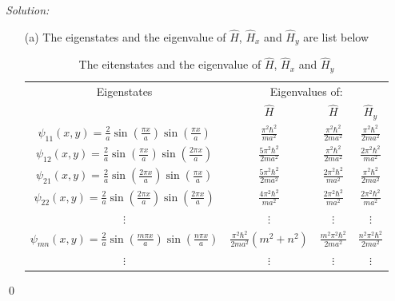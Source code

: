 \documentclass[12pt,a4paper]{article}
\newenvironment{sol}
    {\emph{Solution:}
    }
    {
    \qed
    }
\begin{document}
\begin{sol}
\begin{itemize}
\item[(a)] The eigenstates and the eigenvalue of $\hat{H}$, $\hat{H}_x$ and $\hat{H}_y$ are list below
\begin{table}[h]
\centering
\caption{The eitenstates and the eigenvalue of $\hat{H}$, $\hat{H}_x$ and $\hat{H}_y$}
\begin{tabular}{|c|c|c|c|}
\hline
\multirow{2}{*}{Eigenstates} & \multicolumn{3}{c|}{Eigenvalues of:}                                                                      \\ \cline{2-4} 
                              & $\hat{H}$                             & $\hat{H}$                       & $\hat{H}_y$                     \\ \hline
$\psi_{11}(x,y)=\frac{2}{a}\sin\left(\frac{\pi x}{a}\right)\sin\left(\frac{\pi x}{a}\right)$             & $\frac{\pi^2\hbar^2}{ma^2}$           & $\frac{\pi^2\hbar^2}{2ma^2}$    & $\frac{\pi^2\hbar^2}{2ma^2}$    \\ \hline
$\psi_{12}(x,y)=\frac{2}{a}\sin\left(\frac{\pi x}{a}\right)\sin\left(\frac{2\pi x}{a}\right)$             & $\frac{5\pi^2\hbar^2}{2ma^2}$         & $\frac{\pi^2\hbar^2}{2ma^2}$    & $\frac{2\pi^2\hbar^2}{ma^2}$    \\ \hline
$\psi_{21}(x,y)=\frac{2}{a}\sin\left(\frac{2\pi x}{a}\right)\sin\left(\frac{\pi x}{a}\right)$             & $\frac{5\pi^2\hbar^2}{2ma^2}$         & $\frac{2\pi^2\hbar^2}{ma^2}$    & $\frac{\pi^2\hbar^2}{2ma^2}$    \\ \hline
$\psi_{22}(x,y)=\frac{2}{a}\sin\left(\frac{2\pi x}{a}\right)\sin\left(\frac{2\pi x}{a}\right)$             & $\frac{4\pi^2\hbar^2}{ma^2}$          & $\frac{2\pi^2\hbar^2}{ma^2}$    & $\frac{2\pi^2\hbar^2}{ma^2}$    \\ \hline
$\vdots$                      & $\vdots$                              & $\vdots$                        & $\vdots$                        \\ \hline
$\psi_{mn}(x,y)=\frac{2}{a}\sin\left(\frac{m\pi x}{a}\right)\sin\left(\frac{n\pi x}{a}\right)$             & $\frac{\pi^2\hbar^2}{2ma^2}(m^2+n^2)$ & $\frac{m^2\pi^2\hbar^2}{2ma^2}$ & $\frac{n^2\pi^2\hbar^2}{2ma^2}$ \\ \hline
$\vdots$                      & $\vdots$                              & $\vdots$                        & $\vdots$                        \\ \hline
\end{tabular}

\end{table}
\end{itemize}
\end{sol}
\end{document}
